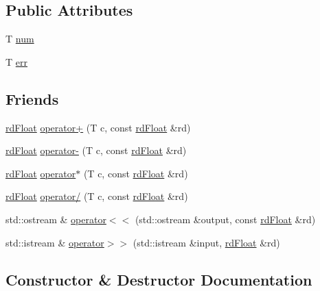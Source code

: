 \subsection*{Public Attributes}
\begin{DoxyCompactItemize}
\item 
T \mbox{\hyperlink{structrd_float_acfb5377d16466e5c9e6549b3cc075ec0}{num}}
\item 
T \mbox{\hyperlink{structrd_float_a7a247930d2563de793390e320d81d33c}{err}}
\end{DoxyCompactItemize}
\subsection*{Friends}
\begin{DoxyCompactItemize}
\item 
\mbox{\hyperlink{structrd_float}{rd\+Float}} \mbox{\hyperlink{structrd_float_a743563bfbe34cc6999543f833a01dcba}{operator+}} (T c, const \mbox{\hyperlink{structrd_float}{rd\+Float}} \&rd)
\item 
\mbox{\hyperlink{structrd_float}{rd\+Float}} \mbox{\hyperlink{structrd_float_a6b2bfc1de75db6222ffa169911e19865}{operator-\/}} (T c, const \mbox{\hyperlink{structrd_float}{rd\+Float}} \&rd)
\item 
\mbox{\hyperlink{structrd_float}{rd\+Float}} \mbox{\hyperlink{structrd_float_a1982068f976c88614485eb52693700ee}{operator$\ast$}} (T c, const \mbox{\hyperlink{structrd_float}{rd\+Float}} \&rd)
\item 
\mbox{\hyperlink{structrd_float}{rd\+Float}} \mbox{\hyperlink{structrd_float_a8dadbd9168037a78a3c0cd7e96f0073f}{operator/}} (T c, const \mbox{\hyperlink{structrd_float}{rd\+Float}} \&rd)
\item 
std\+::ostream \& \mbox{\hyperlink{structrd_float_a56722904366eb9b6860e7151162213c9}{operator$<$$<$}} (std\+::ostream \&output, const \mbox{\hyperlink{structrd_float}{rd\+Float}} \&rd)
\item 
std\+::istream \& \mbox{\hyperlink{structrd_float_a5b99d2ff3f3d58999dd86a5afdd8a843}{operator$>$$>$}} (std\+::istream \&input, \mbox{\hyperlink{structrd_float}{rd\+Float}} \&rd)
\end{DoxyCompactItemize}


\subsection{Constructor \& Destructor Documentation}
\mbox{\label{structrd_float_a3e4fbd41fa0ae882c9f98ec87fc2afde}} 
